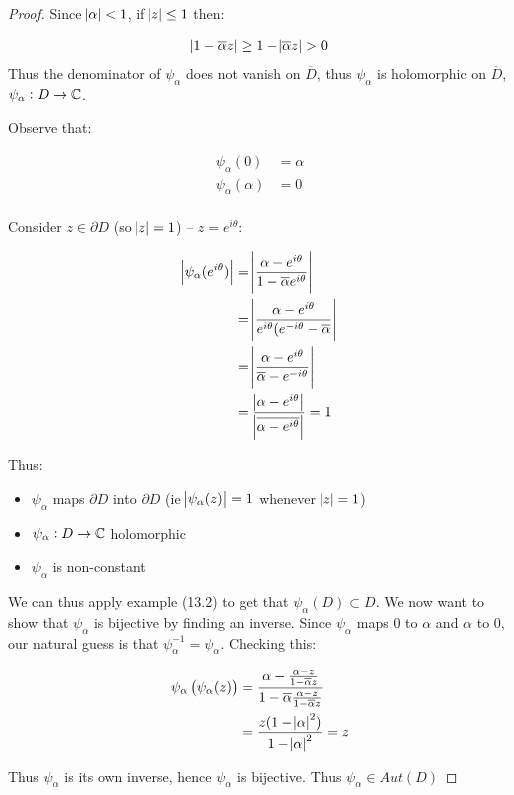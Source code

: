 \begin{proof}
Since $\abs{\alpha} <1$, if $\abs{z} \leq 1$ then:

\begin{align*}
    \abs{1- \overline{\alpha } z} \geq 1 - \abs{\overline{\alpha } z } > 0
\end{align*}
Thus the denominator of $\psi_\alpha$ does not vanish on $\overline{D}$, thus $\psi_\alpha$ is holomorphic on $\overline{D}$, $\psi_\alpha : D \to \mathbb{C}$.

Observe that:

\begin{align*}
    \psi_\alpha(0) &= \alpha\\
    \psi_\alpha(\alpha) &= 0\\
\end{align*}

Consider $z \in \partial D$ (so $\abs{z} = 1$) -- $z = e^{i\theta}$:

\begin{align*}
    \abs{\psi_\alpha(e^{i \theta} )} &= \abs{\frac{\alpha - e^{i \theta}}{1 - \overline{\alpha} e^{i \theta}}}\\
    &= \abs{ \frac{\alpha - e^{i\theta}}{ e^{i \theta} ( e^{ - i \theta} - \overline{\alpha}}}\\
    &= \abs{\frac{\alpha - e^{i \theta}}{\overline{\alpha} - e^{- i \theta}}}\\ &= \frac{ \abs{\alpha - e^{i \theta}}  } { \abs{\overline{\alpha - e^{ i \theta}}}} = 1
\end{align*}

Thus:

\begin{itemize}
    \item $\psi_\alpha$ maps $\partial D$ into $\partial D$ (ie $\abs{\psi_\alpha(z)} = 1$ whenever $\abs{z} = 1$)
    \item $\psi_\alpha : D \to \mathbb{C}$ holomorphic
    \item $\psi_\alpha$ is non-constant
\end{itemize}

We can thus apply example (13.2) to get that $\psi_\alpha (D) \subset D$. We now want to show that $\psi_\alpha$ is bijective by finding an inverse. Since $\psi_\alpha$ maps $0$ to $\alpha$ and $\alpha$ to $0$, our natural guess is that $\psi_\alpha^{-1} = \psi_\alpha$. Checking this:

\begin{align*}
\psi_\alpha \left( \psi_\alpha(z) \right) &= \frac{\alpha - \frac{\alpha - z}{1- \overline{\alpha } z} }{1 - \overline{\alpha} \frac{\alpha - z}{1 - \overline{\alpha} z}}\\
&= \frac{z ( 1- \abs{\alpha} ^2) }{ 1- \abs{\alpha} ^2 } = z
\end{align*}
    
    
    Thus $\psi_\alpha$ is its own inverse, hence $\psi_\alpha$ is bijective. Thus $\psi_\alpha \in Aut(D)$
\end{proof}


